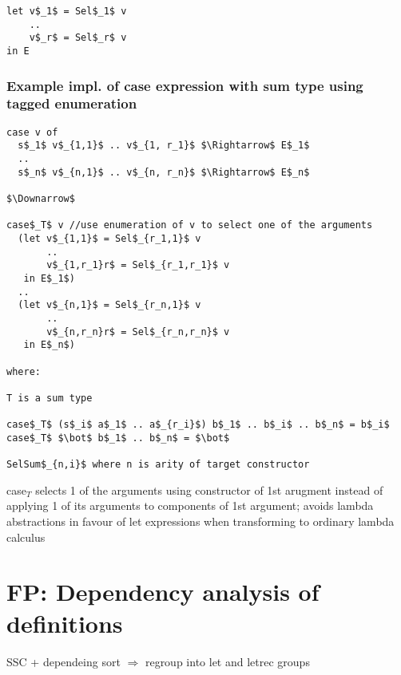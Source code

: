 \documentclass[8pt]{extarticle}
\begin{document}
\begin{multicols*}{2}
\begin{lstlisting}
let v$_1$ = Sel$_1$ v
    ..
    v$_r$ = Sel$_r$ v
in E
\end{lstlisting}

\subsubsection{Example impl. of case expression with sum type using tagged enumeration}

\begin{lstlisting}
case v of
  s$_1$ v$_{1,1}$ .. v$_{1, r_1}$ $\Rightarrow$ E$_1$
  ..
  s$_n$ v$_{n,1}$ .. v$_{n, r_n}$ $\Rightarrow$ E$_n$

$\Downarrow$

case$_T$ v //use enumeration of v to select one of the arguments
  (let v$_{1,1}$ = Sel$_{r_1,1}$ v
       ..
       v$_{1,r_1}r$ = Sel$_{r_1,r_1}$ v
   in E$_1$)
  ..
  (let v$_{n,1}$ = Sel$_{r_n,1}$ v
       ..
       v$_{n,r_n}r$ = Sel$_{r_n,r_n}$ v
   in E$_n$)

where:

T is a sum type

case$_T$ (s$_i$ a$_1$ .. a$_{r_i}$) b$_1$ .. b$_i$ .. b$_n$ = b$_i$
case$_T$ $\bot$ b$_1$ .. b$_n$ = $\bot$

SelSum$_{n,i}$ where n is arity of target constructor

\end{lstlisting}

case$_T$ selects 1 of the arguments using constructor of 1st arugment instead of applying 1 of its arguments to components of 1st argument; avoids lambda abstractions in favour of let expressions when transforming to ordinary lambda calculus

\vfill\null
\columnbreak

\section{FP: Dependency analysis of definitions}

SSC + dependeing sort $\Rightarrow$ regroup into let and letrec groups


\end{multicols*}
\end{document}
